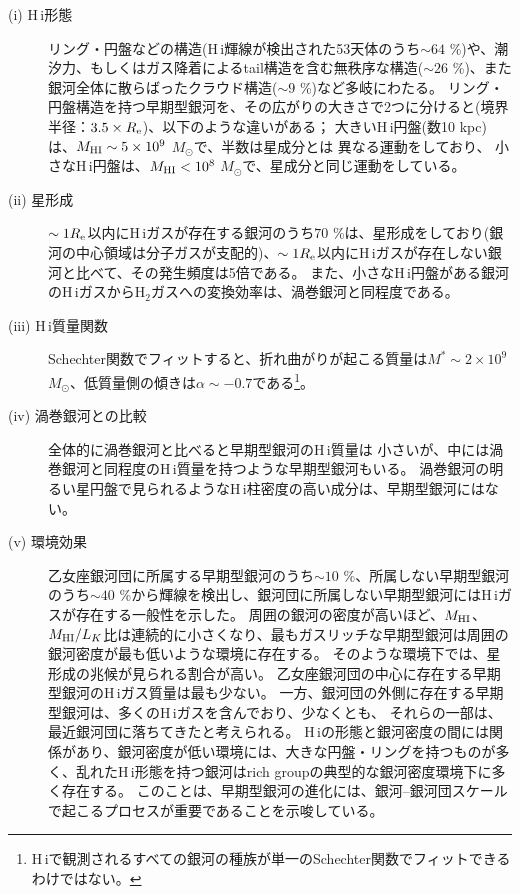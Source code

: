 \begin{description}

\item[(i) H\,{\sc i}形態] リング・円盤などの構造(H\,{\sc i}輝線が検出された53天体のうち$\sim64$ \%)や、潮汐力、もしくはガス降着によるtail構造を含む無秩序な構造($\sim26$ \%)、また銀河全体に散らばったクラウド構造($\sim9$ \%)など多岐にわたる。
リング・円盤構造を持つ早期型銀河を、その広がりの大きさで2つに分けると(境界半径：$3.5\times R_{\rm e}$)、以下のような違いがある；
大きいH\,{\sc i}円盤(数10 kpc)は、$M_{\rm HI}\sim5\times10^9$ $M_\odot$で、半数は星成分とは
異なる運動をしており、
小さなH\,{\sc i}円盤は、$M_{\rm HI}<10^8$ $M_\odot$で、星成分と同じ運動をしている。

\item[(ii) 星形成] $\sim1R_{\rm e}$以内にH\,{\sc i}ガスが存在する銀河のうち$70$ \%は、星形成をしており(銀河の中心領域は分子ガスが支配的)、$\sim1R_{\rm e}$以内にH\,{\sc i}ガスが存在しない銀河と比べて、その発生頻度は5倍である。
また、小さなH\,{\sc i}円盤がある銀河のH\,{\sc i}ガスからH$_2$ガスへの変換効率は、渦巻銀河と同程度である。

\item[(iii) H\,{\sc i}質量関数] Schechter関数でフィットすると、折れ曲がりが起こる質量は$M^\ast\sim2\times10^9$ $M_\odot$、低質量側の傾きは$\alpha\sim-0.7$である\footnote{H\,{\sc i}で観測されるすべての銀河の種族が単一のSchechter関数でフィットできるわけではない。}。

\item[(iv) 渦巻銀河との比較] 全体的に渦巻銀河と比べると早期型銀河のH\,{\sc i}質量は
小さいが、中には渦巻銀河と同程度のH\,{\sc i}質量を持つような早期型銀河もいる。
渦巻銀河の明るい星円盤で見られるようなH\,{\sc i}柱密度の高い成分は、早期型銀河にはない。

\item[(v) 環境効果] 乙女座銀河団に所属する早期型銀河のうち$\sim10$ \%、所属しない早期型銀河のうち$\sim40$ \%から輝線を検出し、銀河団に所属しない早期型銀河にはH\,{\sc i}ガスが存在する一般性を示した。
周囲の銀河の密度が高いほど、$M_{\rm HI}$、$M_{\rm HI}/L_K$比は連続的に小さくなり、最もガスリッチな早期型銀河は周囲の銀河密度が最も低いような環境に存在する。
そのような環境下では、星形成の兆候が見られる割合が高い。
乙女座銀河団の中心に存在する早期型銀河のH\,{\sc i}ガス質量は最も少ない。
一方、銀河団の外側に存在する早期型銀河は、多くのH\,{\sc i}ガスを含んでおり、少なくとも、
それらの一部は、%
最近銀河団に落ちてきたと考えられる。
H\,{\sc i}の形態と銀河密度の間には関係があり、銀河密度が低い環境には、大きな円盤・リングを持つものが多く、乱れたH\,{\sc i}形態を持つ銀河はrich groupの典型的な銀河密度環境下に多く存在する。
このことは、早期型銀河の進化には、銀河--銀河団スケールで起こるプロセスが重要であることを示唆している。
\end{description}


